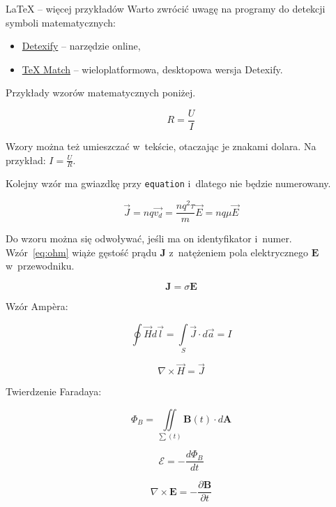\begin{easyappendix}{\LaTeX{} -- więcej przykładów}
Warto zwrócić uwagę na programy do detekcji symboli matematycznych:
\begin{itemize}
	\item \href{https://detexify.kirelabs.org/classify.html}{Detexify} -- narzędzie online,
	\item \href{https://github.com/zoeyfyi/TeX-Match}{TeX Match} -- wieloplatformowa, desktopowa wersja Detexify.
\end{itemize}

Przykłady wzorów matematycznych poniżej.

\begin{equation}
	R = \frac{U}{I}
\end{equation}

Wzory można też umieszczać w~tekście, otaczając je znakami dolara. Na przykład: $I=\frac{U}{R}$.

Kolejny wzór ma gwiazdkę przy \texttt{equation} i~dlatego nie będzie numerowany.

\begin{equation*}
	\vec{J} = nq \vec{v_d} =  \frac{nq^2 \tau}{m} \vec{E} = nq \mu \vec{E}    
\end{equation*}

Do wzoru można się odwoływać, jeśli ma on identyfikator i~numer. Wzór~\ref{eq:ohm} wiąże gęstość prądu $\pmb{J}$ z~natężeniem pola elektrycznego $\pmb{E}$ w~przewodniku.

\begin{equation}
	\pmb{J} = \sigma \pmb{E}
	\label{eq:ohm}
\end{equation}


Wzór Ampèra:

\begin{equation}
	\oint \vec{H} d\vec{l} = \int\limits_{S} \vec{J} \cdot d \vec{a} = I
\end{equation}

\begin{equation}
	\nabla \times \vec{H} = \vec{J}
\end{equation}


Twierdzenie Faradaya:

\begin{equation*}
	\Phi_B = \iint\limits_{\sum (t)} \pmb{B}(t) \cdot d\pmb{A}
\end{equation*}

\begin{equation}
	\mathcal{E} = -\frac{d\Phi_B}{dt}
\end{equation}

\begin{equation}
	\nabla \times \pmb{E} = - \frac{\partial \pmb{B}}{\partial t}
\end{equation}


\end{easyappendix}
